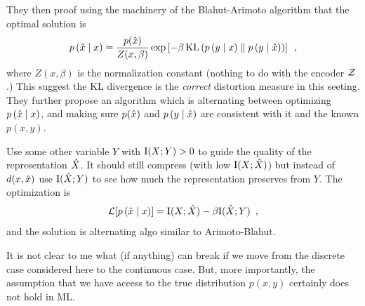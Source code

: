 They then proof using the machinery of the Blahut-Arimoto algorithm that the optimal solution is 
\begin{equation}
p \left( \hat{x} \mid x \right) = \frac{p(\hat{x})}{Z(x, \beta)}
\exp \left[ -\beta \operatorname*{KL} \left( p \left( y \mid x \right) \parallel p \left( y \mid \hat{x} \right) \right) \right] \enspace ,
\end{equation}
where $Z(x, \beta)$ is the normalization constant (nothing to do with the encoder $\mathcal{Z}$.)
This suggest the KL divergence is the \emph{correct} distortion measure in this seeting.
They further propose an algorithm which is alternating between optimizing $p \left( \hat{x} \mid x \right)$, and making sure $p(\hat{x})$ and $p \left( y \mid \hat{x} \right)$ are consistent with it and the known $p(x, y)$.

\begin{notebox}
\tldr Use some other variable $Y$ with $\mathrm{I}(X; Y) > 0$ to guide the quality of the representation $\hat{X}$. It should still compress (with low $\mathrm{I}(X; \hat{X})$) but instead of $d(x, \hat{x})$ use $\mathrm{I}(\hat{X}; Y)$ to see how much the representation preserves from $Y$. The optimization is 
\begin{equation}
\mathcal{L}[ p \left( \hat{x} \mid x \right)] = \mathrm{I}(X; \hat{X}) - \beta \mathrm{I}(\hat{X}; Y) \enspace ,
\end{equation}
and the solution is alternating algo similar to Arimoto-Blahut.
\end{notebox}

\begin{notebox}
\concl 
It is not clear to me what (if anything) can break if we move from the discrete case considered here to the continuous case.
But, more importantly, the assumption that we have access to the true distribution $p(x, y)$ certainly does not hold in ML.
\end{notebox}
